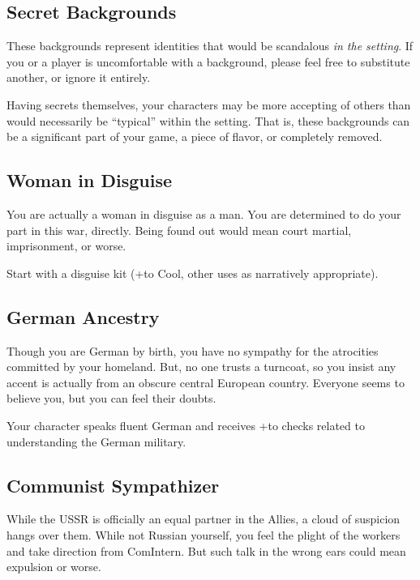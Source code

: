 \documentclass{book}
\newcommand{\bbb}{\BoostDie }
\begin{document}
\begin{multicols}{2}
\newpage

\section{Secret Backgrounds}

These backgrounds represent identities that would be scandalous \emph{in the setting}.  If you or a player is uncomfortable with a background, please feel free to substitute another, or ignore it entirely.

Having secrets themselves, your characters may be more accepting of others than would necessarily be ``typical'' within the setting.  That is, these backgrounds can be a significant part of your game, a piece of flavor, or completely removed.

\subsection{Woman in Disguise}

You are actually a woman in disguise as a man.  You are determined to do your part in this war, directly.  Being found out would mean court martial, imprisonment, or worse.

Start with a disguise kit (+\bbb to Cool, other uses as narratively appropriate).

\subsection{German Ancestry}

Though you are German by birth, you have no sympathy for the atrocities committed by your homeland.  But, no one trusts a turncoat, so you insist any accent is actually from an obscure central European country.  Everyone seems to believe you, but you can feel their doubts.

Your character speaks fluent German and receives +\bbb to checks related to understanding the German military.

\subsection{Communist Sympathizer}

While the USSR is officially an equal partner in the Allies, a cloud of suspicion hangs over them.  While not Russian yourself, you feel the plight of the workers and take direction from ComIntern.  But such talk in the wrong ears could mean expulsion or worse.


\end{multicols}
\end{document}
